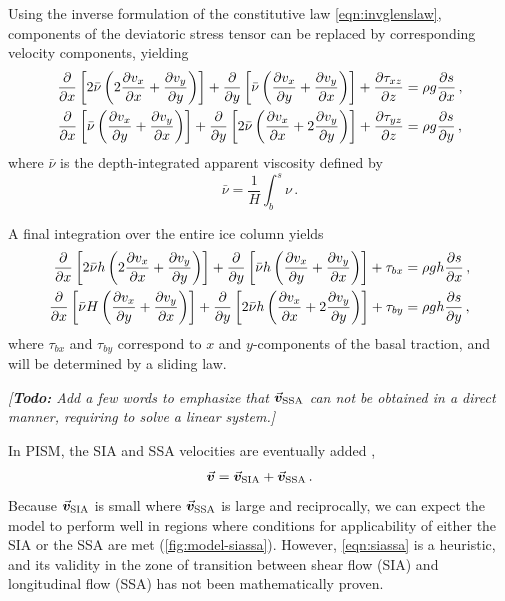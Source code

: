 \documentclass{article}
\newcommand{\todo}[1]{\emph{[\textbf{Todo:} #1]}}
\newcommand{\vect}[1]{\va*{#1}} %
\newcommand{\vv}[0]{\vect{v}}           %
\newcommand{\vsia}[0]{\vv_{\mathrm{SIA}}}   %
\newcommand{\vssa}[0]{\vv_{\mathrm{SSA}}}   %
\begin{document}
Using the inverse formulation of the constitutive law \eqref{eqn:invglenslaw},
components of the deviatoric stress tensor can be replaced by corresponding
velocity components, yielding
\begin{subequations}
\begin{align}
    \pdv{x} \left[2\bar{\nu}
                  \left(2\pdv{v_x}{x} + \pdv{v_y}{y}\right) \right]
        + \pdv{y} \left[\bar{\nu}
                        \left(\pdv{v_x}{y} + \pdv{v_y}{x}\right) \right]
        + \pdv{\tau_{xz}}{z} &= \rho g \pdv{s}{x} \,, \\
    \pdv{x} \left[\bar{\nu}
                  \left(\pdv{v_x}{y} + \pdv{v_y}{x}\right) \right]
        + \pdv{y} \left[2\bar{\nu}
                        \left(\pdv{v_x}{x} + 2\pdv{v_y}{y}\right) \right]
         + \pdv{\tau_{yz}}{z} &= \rho g \pdv{s}{y} \,,
\end{align}
\end{subequations}
where $\bar{\nu}$ is the depth-integrated apparent viscosity defined by
\begin{equation}
    \bar{\nu} = \frac{1}{H}\int_b^s\nu \,.
\end{equation}

A final integration over the entire ice column yields
\citep[Eqs.~7.7--7.8]{Weis.etal.1999}
\begin{subequations}
\begin{align}
    \label{eqn:vssa}
    \pdv{x} \left[2\bar{\nu}h
                  \left(2\pdv{v_x}{x} + \pdv{v_y}{y}\right) \right]
        + \pdv{y} \left[\bar{\nu}h
                        \left(\pdv{v_x}{y} + \pdv{v_y}{x}\right) \right]
        + \tau_{bx} &= \rho gh \pdv{s}{x} \,, \\
    \pdv{x} \left[\bar{\nu}H
                  \left(\pdv{v_x}{y} + \pdv{v_y}{x}\right) \right]
        + \pdv{y} \left[2\bar{\nu}h
                        \left(\pdv{v_x}{x} + 2\pdv{v_y}{y}\right) \right]
        + \tau_{by} &= \rho gh \pdv{s}{y} \,,
\end{align}
\end{subequations}
where $\tau_{bx}$ and $\tau_{by}$ correspond to $x$ and $y$-components of the
basal traction, and will be determined by a sliding law.

\todo{Add a few words to emphasize that $\vssa$ can not be obtained in a
      direct manner, requiring to solve a linear system.}

In PISM, the SIA and SSA velocities are eventually added
\citep[Eq.~15]{Winkelmann.etal.2011},
\begin{equation}
    \label{eqn:siassa}
    \vv = \vsia + \vssa \,.
\end{equation}
Because $\vsia$ is small where $\vssa$ is large and
reciprocally, we can expect the model to perform well in regions where
conditions for applicability of either the SIA or the SSA are met
(\cref{fig:model-siassa}). However,
\cref{eqn:siassa} is a heuristic, and its validity in the zone of
transition between shear flow (SIA) and longitudinal flow (SSA) has not been
mathematically proven.
\end{document}
